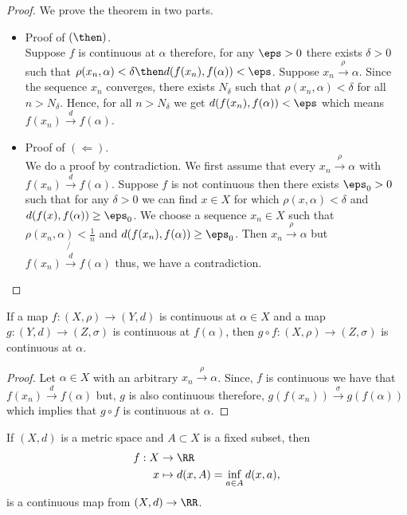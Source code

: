 \documentclass[12pt, a4paper]{article}
\begin{document}
\begin{proof}
    We prove the theorem in two parts.
    \begin{itemize}
        \item Proof of \((\then)\). \\
        Suppose \(f\) is continuous at \(\alpha\) therefore, for any \(\eps>0\) there exists \(\delta>0\) such that \(\rho(x_n, \alpha)<\delta \then d(f(x_n),f(\alpha))<\eps\). Suppose \(x_n \xrightarrow{\rho} \alpha\). Since the sequence \(x_n\) converges, there exists \(N_{\delta}\) such that \(\rho(x_n,\alpha)<\delta\) for all \(n > N_{\delta}\). Hence, for all \(n > N_{\delta}\) we get \(d(f(x_n),f(\alpha))<\eps\) which means \(f(x_n) \xrightarrow{d} f(\alpha)\).
        \item Proof of \((\Leftarrow)\). \\
        We do a proof by contradiction. We first assume that every \(x_n \xrightarrow{\rho} \alpha\) with \(f(x_n) \xrightarrow{d} f(\alpha)\). Suppose \(f\) is not continuous then there exists \(\eps_0>0\) such that for any \(\delta>0\) we can find \(x \in X\) for which \(\rho(x,\alpha)<\delta\) and \(d(f(x), f(\alpha))\geq \eps_0\). We choose a sequence \(x_n \in X\) such that \(\rho(x_n, \alpha)<\frac{1}{n}\) and \(d(f(x_n),f(\alpha))\geq \eps_0\). Then \(x_n \xrightarrow{\rho} \alpha\) but \(f(x_n) \not{\xrightarrow{d}} f(\alpha)\) thus, we have a contradiction.
    \end{itemize}
\end{proof}

\begin{theorem}
    If a map \(f:(X,\rho) \to (Y,d)\) is continuous at \(\alpha \in X\) and a map \(g :(Y,d) \to (Z,\sigma)\) is continuous at \(f(\alpha)\), then \(g \circ f : (X,\rho) \to (Z,\sigma)\) is continuous at \(\alpha\).
\end{theorem}

\begin{proof}
    Let \(\alpha \in X\) with an arbitrary \(x_n \xrightarrow{\rho} \alpha\). Since, \(f\) is continuous we have that \(f(x_n) \xrightarrow{d} f(\alpha)\) but, \(g\) is also continuous therefore, \(g(f(x_n)) \xrightarrow{\sigma} g(f(\alpha))\) which implies that \(g \circ f\) is continuous at \(\alpha\).
\end{proof}

\begin{mdlemma}
    If \((X,d)\) is a metric space and \(A \subset X\) is a fixed subset, then 
    \[\begin{aligned}
        f: X &\to \RR \\
        x &\mapsto d(x,A) = \inf_{a \in A} d(x,a),
    \end{aligned}\]
    is a continuous map from \((X,d) \to \RR\).
\end{mdlemma}
\end{document}
